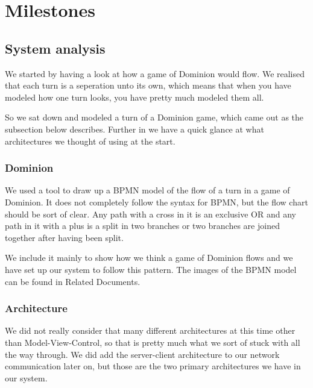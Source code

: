 \section{Milestones}
\subsection{System analysis}
We started by having a look at how a game of Dominion would flow. We realised that each turn is a seperation unto its own, which means that when you have modeled how one turn looks, you have pretty much modeled them all. 

So we sat down and modeled a turn of a Dominion game, which came out as the subsection below describes. Further in we have a quick glance at what architectures we thought of using at the start.
\subsubsection{Dominion}
We used a tool to draw up a BPMN model of the flow of a turn in a game of Dominion. It does not completely follow the syntax for BPMN, but the flow chart should be sort of clear. Any path with a cross in it is an exclusive OR and any path in it with a plus is a split in two branches or two branches are joined together after having been split. 

We include it mainly to show how we think a game of Dominion flows and we have set up our system to follow this pattern. The images of the BPMN model can be found in Related Documents.
\subsubsection{Architecture}
We did not really consider that many different architectures at this time other than Model-View-Control, so that is pretty much what we sort of stuck with all the way through. We did add the server-client architecture to our network communication later on, but those are the two primary architectures we have in our system.